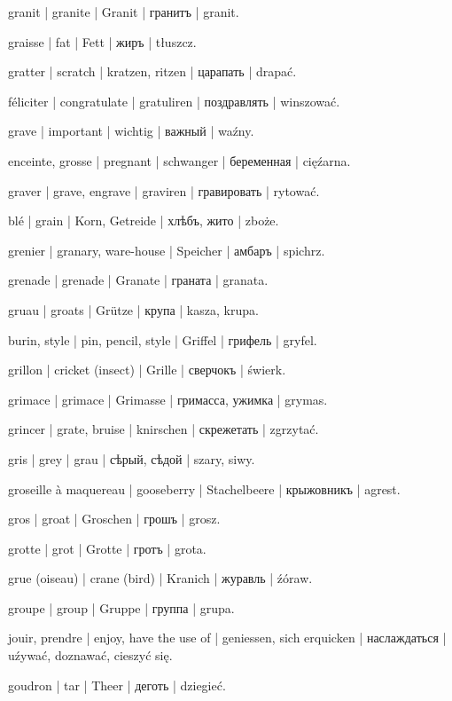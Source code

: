 \begin{outdent}{1em}
granit | granite | Granit | гранитъ | granit.

graisse | fat | Fett | жиръ | tłuszcz.

gratter | scratch | kratzen, ritzen | царапать | drapać.

féliciter | congratulate | gratuliren | поздравлять | winszować.

grave | important | wichtig | важный | waźny.

enceinte, grosse | pregnant | schwanger | беременная | cięźarna.

graver | grave, engrave | graviren | гравировать | rytować.

blé | grain | Korn, Getreide | хлѣбъ, жито | zboże.

\uvsubentry{}
grenier | granary, ware-house | Speicher | амбаръ | spichrz.

grenade | grenade | Granate | граната | granata.

gruau | groats | Grütze | крупа | kasza, krupa.

burin, style | pin, pencil, style | Griffel | грифель | gryfel.

grillon | cricket (insect) | Grille | сверчокъ | świerk.

grimace | grimace | Grimasse | гримасса, ужимка | grymas.

grincer | grate, bruise | knirschen | скрежетать | zgrzytać.

gris | grey | grau | сѣрый, сѣдой | szary, siwy.

groseille à maquereau | gooseberry | Stachelbeere | крыжовникъ | agrest.

gros | groat | Groschen | грошъ | grosz.

grotte | grot | Grotte | гротъ | grota.

grue (oiseau) | crane (bird) | Kranich | журавль | źóraw.

groupe | group | Gruppe | группа | grupa.

jouir, prendre | enjoy, have the use of | geniessen, sich
erquicken | наслаждаться | uźywać, doznawać, cieszyć się.

goudron | tar | Theer | деготь | dziegieć.


\end{outdent}
